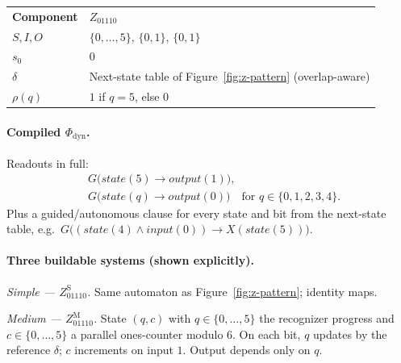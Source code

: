 \begingroup
\renewcommand{\arraystretch}{1.2}
\footnotesize
\begin{center}
\begin{tabularx}{0.78\linewidth}{@{}>{\raggedright\arraybackslash}p{2.8cm}Y@{}}
    \headingfont\bfseries Component & \headingfont\bfseries $Z_{01110}$ \\
    \addlinespace[2pt]
    $S,I,O$ & $\{0,\ldots,5\}$, $\{0,1\}$, $\{0,1\}$ \\
    \addlinespace[2pt]
    $s_0$ & $0$ \\
    \addlinespace[2pt]
    $\delta$ & Next-state table of Figure~\ref{fig:z-pattern} (overlap-aware) \\
    \addlinespace[2pt]
    $\rho(q)$ & $1$ if $q=5$, else $0$ \\
\end{tabularx}
\end{center}
\label{tab:z-pattern}
\endgroup
\vspace{4pt}

\paragraph{Compiled $\Phi_{\mathrm{dyn}}$.}
Readouts in full:
\begin{align*}
  &G\bigl(\mathit{state}(5) \rightarrow \mathit{output}(1)\bigr), \\
  &G\bigl(\mathit{state}(q) \rightarrow \mathit{output}(0)\bigr)
    \quad\text{for } q\in\{0,1,2,3,4\}.
\end{align*}
Plus a guided/autonomous clause for every state and bit from the next-state table, e.g.\
$G\bigl((\mathit{state}(4)\wedge\mathit{input}(0)) \rightarrow X(\mathit{state}(5))\bigr)$.

\paragraph{Three buildable systems (shown explicitly).}

\textit{Simple --- $Z_{01110}^{\mathrm{S}}$.}
Same automaton as Figure~\ref{fig:z-pattern}; identity maps.

\textit{Medium --- $Z_{01110}^{\mathrm{M}}$.}
State $(q,c)$ with $q\in\{0,\ldots,5\}$ the recognizer progress and $c\in\{0,\ldots,5\}$ a parallel ones-counter modulo $6$. On each bit, $q$ updates by the reference $\delta$; $c$ increments on input $1$. Output depends only on $q$.

